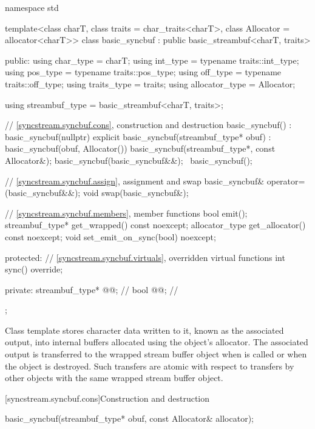 %
\begin{codeblock}
namespace std {
  template<class charT, class traits = char_traits<charT>, class Allocator = allocator<charT>>
  class basic_syncbuf : public basic_streambuf<charT, traits> {
  public:
    using char_type      = charT;
    using int_type       = typename traits::int_type;
    using pos_type       = typename traits::pos_type;
    using off_type       = typename traits::off_type;
    using traits_type    = traits;
    using allocator_type = Allocator;

    using streambuf_type = basic_streambuf<charT, traits>;

    // \ref{syncstream.syncbuf.cons}, construction and destruction
    basic_syncbuf()
      : basic_syncbuf(nullptr) {}
    explicit basic_syncbuf(streambuf_type* obuf)
      : basic_syncbuf(obuf, Allocator()) {}
    basic_syncbuf(streambuf_type*, const Allocator&);
    basic_syncbuf(basic_syncbuf&&);
    ~basic_syncbuf();

    // \ref{syncstream.syncbuf.assign}, assignment and swap
    basic_syncbuf& operator=(basic_syncbuf&&);
    void swap(basic_syncbuf&);

    // \ref{syncstream.syncbuf.members}, member functions
    bool emit();
    streambuf_type* get_wrapped() const noexcept;
    allocator_type get_allocator() const noexcept;
    void set_emit_on_sync(bool) noexcept;

  protected:
    // \ref{syncstream.syncbuf.virtuals}, overridden virtual functions
    int sync() override;

  private:
    streambuf_type* @@;    // \expos
    bool @@{};        // \expos
  };
}
\end{codeblock}

\pnum
Class template  stores character data
written to it, known as the associated output, into internal
buffers allocated using the object's allocator.
The associated output is transferred to the
wrapped stream buffer object 
when  is called
or when the  object is destroyed.
Such transfers are atomic with respect to transfers
by other  objects
with the same wrapped stream buffer object.

[syncstream.syncbuf.cons]{Construction and destruction}

%
\begin{itemdecl}
basic_syncbuf(streambuf_type* obuf, const Allocator& allocator);
\end{itemdecl}

